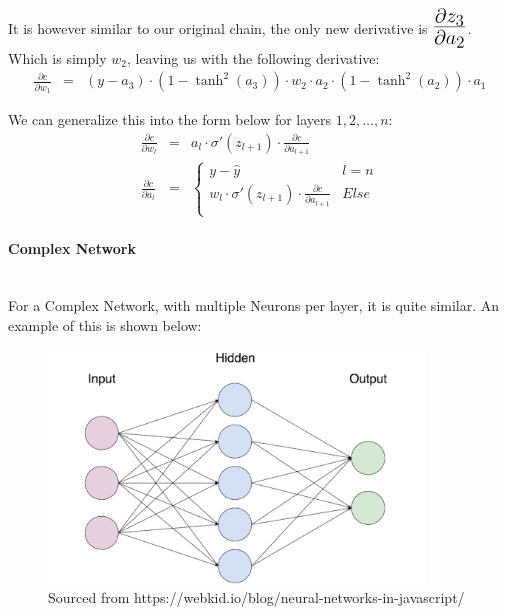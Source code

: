 \begin{flushleft}
                    It is however similar to our original chain, the only new derivative is $\mathLarge{\frac{\partial z_3}{\partial a_2}}$.
                    Which is simply $w_2$, leaving us with the following derivative:
                    \begin{eqnarray*}
                        \frac{\partial c}{\partial w_{1}} &=& (y - a_3) \cdot (1 - \tanh^{2}(a_3)) \cdot w_2 \cdot a_2 \cdot (1 - \tanh^{2}(a_2)) \cdot a_1
                    \end{eqnarray*}

                    We can generalize this into the form below for layers $1,2, \hdots, n$:
                    \begin{eqnarray*}
                        \frac{\partial c}{\partial w_{l}} &=& a_l \cdot \sigma'(z_{l+1}) \cdot \frac{\partial c}{\partial a_{l+1}} \\
                        \frac{\partial c}{\partial a_{l}} &=&
                        \begin{cases}
                            y - \hat{y} & l = n \\
                            w_l \cdot \sigma'(z_{l+1}) \cdot \frac{\partial c}{\partial a_{l+1}} & Else \\
                        \end{cases} 
                    \end{eqnarray*}

                \paragraph{Complex Network} \mbox{} \\ 
                    For a Complex Network, with multiple Neurons per layer, it is quite similar. An example of this is shown below: \\

                    \begin{figure}[H]
                        \centerline{\includegraphics[width=10cm]{Images/InitialResearch/NeuralNetworkExample.png}}
                        \caption*{Sourced from https://webkid.io/blog/neural-networks-in-javascript/}
                    \end{figure}


\end{flushleft}
